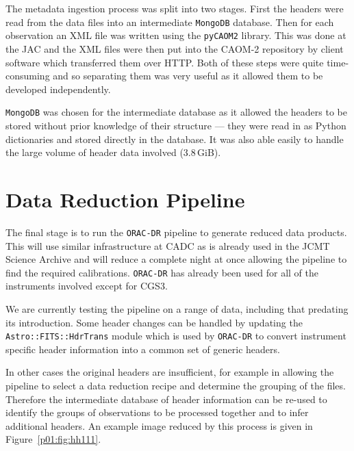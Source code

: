 \documentclass[11pt,twoside]{article}
\begin{document}
The metadata ingestion process was split into two stages.
First the headers were
read from the data files into an intermediate
\texttt{MongoDB} database.
Then for each observation an XML file was written
using the \texttt{pyCAOM2} library.
This was done at the JAC
and the XML files were then put into
the CAOM-2 repository
by client software which transferred them over HTTP.
Both of these steps were quite time-consuming
and so separating them was very useful
as it allowed them to be developed
independently.

\texttt{MongoDB} was chosen for the intermediate database
as it allowed the
headers to be stored without prior knowledge of their structure
--- they were read in as Python dictionaries and
stored directly in the database.
It was also able easily to handle the large
volume of header data involved (3.8\,GiB).

\section{Data Reduction Pipeline}

The final stage is to run the \texttt{ORAC-DR} pipeline
\citep{1999ASPC..172...11E,2008AN....329..295C}
to generate reduced
data products.
This will use similar infrastructure at CADC as is already
used in the JCMT Science Archive
\citep{2011ASPC..442..203E}
and will reduce a complete night at once allowing
the pipeline to find the required calibrations.
\texttt{ORAC-DR} has already been used for all of the instruments
involved except for CGS3.

We are currently testing the pipeline on a range of data,
including that predating its introduction.
Some header changes can be handled by updating the
\texttt{Astro::\-FITS::\-HdrTrans} module
\citep[section 2.2]{2008AN....329..295C}
which is used by \texttt{ORAC-DR} to convert
instrument specific header information into
a common set of generic headers.

In other cases the original headers are insufficient,
for example in allowing the pipeline to
select a data reduction recipe and determine the
grouping of the files.
Therefore the intermediate database of header information
can be re-used to identify
the groups of observations to be processed together and to infer
additional headers.
An example image reduced by this process is given in
Figure~\ref{p01:fig:hh111}.

\end{document}
